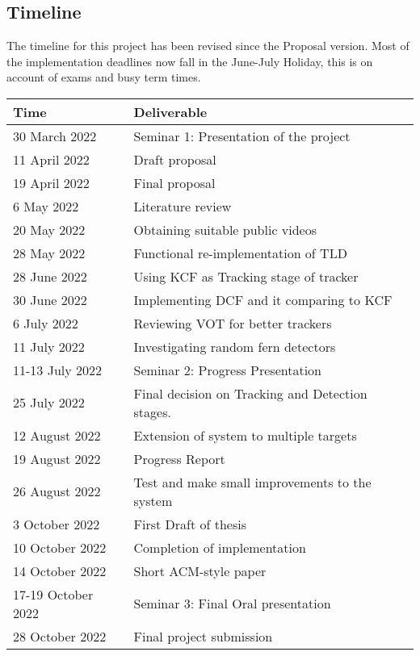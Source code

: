 \subsection{Timeline}
The timeline for this project has been revised since the Proposal version.
Most of the implementation deadlines now fall in the June-July Holiday, this is on account of exams and busy term times.
\begin{center}
  \begin{tabular}{l l}
    \toprule
      Time & Deliverable\\
    \midrule
      30 March 2022     & Seminar 1: Presentation of the project\\
      11 April 2022     & Draft proposal\\
      19 April 2022     & Final proposal\\
      6 May 2022        & Literature review\\
      20 May 2022       & Obtaining suitable public videos\\
      28 May 2022       & Functional re-implementation of TLD\\
      28 June 2022      & Using KCF as Tracking stage of tracker\\
      30 June 2022      & Implementing DCF and it comparing to KCF\\
      6 July 2022       & Reviewing VOT for better trackers\\
      11 July 2022      & Investigating random fern detectors\\
      11-13 July 2022   & Seminar 2: Progress Presentation\\
      25 July 2022      & Final decision on Tracking and Detection stages.\\
      12 August 2022    & Extension of system to multiple targets\\
      19 August 2022    & Progress Report\\
      26 August 2022    & Test and make small improvements to the system\\
      3 October 2022    & First Draft of thesis\\
      10 October 2022   & Completion of implementation\\
      14 October 2022   & Short ACM-style paper\\
      17-19 October 2022& Seminar 3: Final Oral presentation\\
      28 October 2022   & Final project submission\\
    \bottomrule
  \end{tabular}
\end{center}
